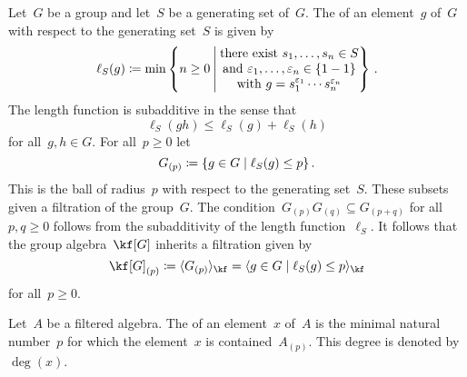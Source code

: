 \begin{examples}
\begin{enumerate}
      Let~$G$ be a group and let~$S$ be a generating set of~$G$.
      The  of an element~$g$ of~$G$ with respect to the generating set~$S$ is given by
      \[
        \ell_S(g)
        \defined
        \min
        \left\{
          n \geq 0
        \suchthat*
          \begin{tabular}{@{}c@{}}
            there exist~$s_1, \dotsc, s_n \in S$ \\
            and~$\varepsilon_1, \dots, \varepsilon_n \in \{1 -1\}$ \\
            with~$g = s_1^{\varepsilon_1} \dotsm s_n^{\varepsilon_n}$
          \end{tabular}
        \right\}  \,.
      \]
      The length function is subadditive in the sense that
      \[
        \ell_S(gh)
        \leq
        \ell_S(g) + \ell_S(h)
      \]
      for all~$g, h \in G$.
      For all~$p \geq 0$ let
      \[
        G_{(p)}
        \defined
        \{
          g \in G
        \suchthat
          \ell_S(g) \leq p
        \}  \,.
      \]
      This is the ball of radius~$p$ with respect to the generating set~$S$.
      These subsets given a filtration of the group~$G$.
      The condition~$G_{(p)} G_{(q)} \subseteq G_{(p + q)}$ for all~$p, q \geq 0$ follows from the subadditivity of the length function~$\ell_S$.
      It follows that the group algebra~$\kf[G]$ inherits a filtration given by
      \[
        \kf[G]_{(p)}
        \defined
        \gen{ G_{(p)} }_{\kf}
        =
        \gen{
          g \in G
        \suchthat
          \ell_S(g) \leq p
        }_{\kf} 
      \]
      for all~$p \geq 0$.
  \end{enumerate}
\end{examples}


\begin{definition}
  Let~$A$ be a filtered algebra.
  The  of an element~$x$ of~$A$ is the minimal natural number~$p$ for which the element~$x$ is contained~$A_{(p)}$.
  This degree is denoted by~$\deg(x)$.
\end{definition}


